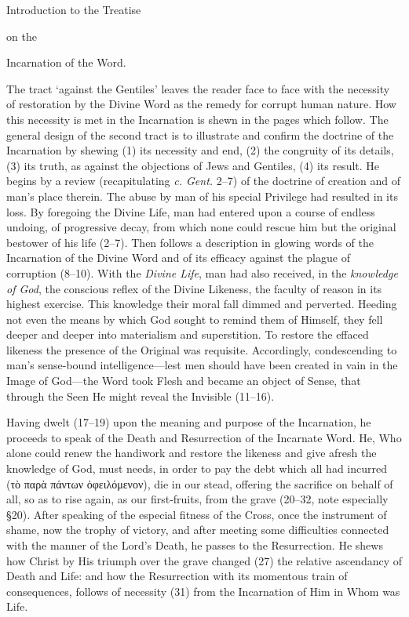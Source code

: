 
Introduction to the Treatise

on the

Incarnation of the Word.

The tract ‘against the Gentiles’ leaves the reader face to face with the necessity of restoration by the Divine Word as the remedy for corrupt human nature. How this necessity is met in the Incarnation is shewn in the pages which follow. The general design of the second tract is to illustrate and confirm the doctrine of the Incarnation by shewing (1) its necessity and end, (2) the congruity of its details, (3) its truth, as against the objections of Jews and Gentiles, (4) its result. He begins by a review (recapitulating \emph{c. Gent.} 2–7) of the doctrine of creation and of man’s place therein. The abuse by man of his special Privilege had resulted in its loss. By foregoing the Divine Life, man had entered upon a course of endless undoing, of progressive decay, from which none could rescue him but the original bestower of his life (2–7). Then follows a description in glowing words of the Incarnation of the Divine Word and of its efficacy against the plague of corruption (8–10). With the \emph{Divine Life}, man had also received, in the \emph{knowledge of God}, the conscious reflex of the Divine Likeness, the faculty of reason in its highest exercise. This knowledge their moral fall dimmed and perverted. Heeding not even the means by which God sought to remind them of Himself, they fell deeper and deeper into materialism and superstition. To restore the effaced likeness the presence of the Original was requisite. Accordingly, condescending to man’s sense-bound intelligence—lest men should have been created in vain in the Image of God—the Word took Flesh and became an object of Sense, that through the Seen He might reveal the Invisible (11–16).

Having dwelt (17–19) upon the meaning and purpose of the Incarnation, he proceeds to speak of the Death and Resurrection of the Incarnate Word. He, Who alone could renew the handiwork and restore the likeness and give afresh the knowledge of God, must needs, in order to pay the debt which all had incurred (\textgreek{τὸ παρὰ πάντων ὀφειλόμενον}), die in our stead, offering the sacrifice on behalf of all, so as to rise again, as our first-fruits, from the grave (20–32, note especially §20). After speaking of the especial fitness of the Cross, once the instrument of shame, now the trophy of victory, and after meeting some difficulties connected with the manner of the Lord’s Death, he passes to the Resurrection. He shews how Christ by His triumph over the grave changed (27) the relative ascendancy of Death and Life: and how the Resurrection with its momentous train of consequences, follows of necessity (31) from the Incarnation of Him in Whom was Life.

